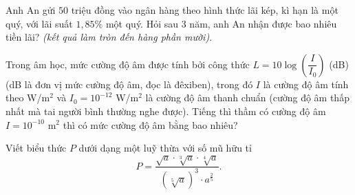 \begin{bt}%
	Anh An gửi $50$ triệu đồng vào ngân hàng theo hình thức lãi kép, kì hạn là một quý, với lãi suất $1,85\%$ một quý. Hỏi sau 3 năm, anh An nhận được bao nhiêu tiền lãi? {\it (kết quả làm tròn đến hàng phần mười)}.
\end{bt}

\begin{bt}%
Trong âm học, mức cường độ âm được tính bởi công thức $ L=10\log\left(\dfrac{I}{I_0}\right)$ (dB) (dB là đơn vị mức cường độ âm, đọc là đêxiben), trong đó $I$ là cường độ âm tính theo  W/m$^2$ và $I_0=10^{-12}$ W/m$^2$ là cường độ âm thanh chuẩn (cường độ âm thấp nhất mà tai người bình thường nghe được). Tiếng thì thầm có cường độ âm $ I=10^{-10}$ m$^2$ thì có mức cường độ âm bằng bao nhiêu?
\end{bt}

\begin{bt}%
Viết biểu thức $P$ dưới dạng một luỹ thừa với số mũ hữu tỉ $$P=\dfrac{\sqrt{a}\cdot\sqrt[3]{a}\cdot\sqrt[4]{a}}{\left(\sqrt[5]{a}\right)^3\cdot a^{\tfrac{2}{5}}}.$$
\end{bt}


